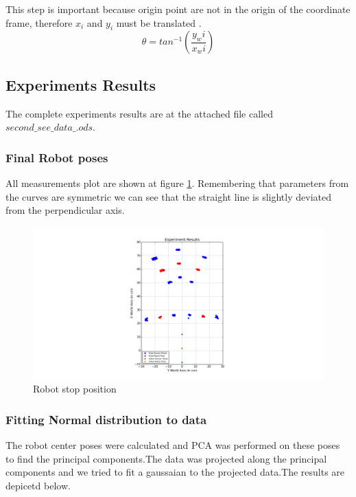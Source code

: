 \documentclass[10pt]{scrartcl}
\begin{document}
\normalsize
This step is important because origin point are not in the origin of the coordinate frame, therefore $x_i$ and $y_i$ must be translated .
	\[
	\theta = tan^{-1}\left(\frac{y_wi}{x_wi}\right)
	\]

\subsection*{Experiments Results}

The complete experiments results are at the attached file called $second\_see \_data\_.ods$.\\
\subsubsection*{Final Robot poses}

All measurements plot are shown at figure \ref{fig:10}. Remembering that parameters from the curves are symmetric we can see that the straight line is slightly deviated from the perpendicular axis.\\

\begin{figure}[H]
\caption{Robot stop position}
\label{fig:10}
\centering
\includegraphics[trim={2000 0 2000 0},scale=0.70]{images/robot_pose_new_modified}
\end{figure}



\subsubsection*{Fitting Normal distribution to data}
\label{sec:fitdata}

The robot center poses were calculated and PCA was performed on these poses to find the principal components.The data was projected along the principal components and we tried to fit a gaussaian to the projected data.The results are depicetd below.
\end{document}
